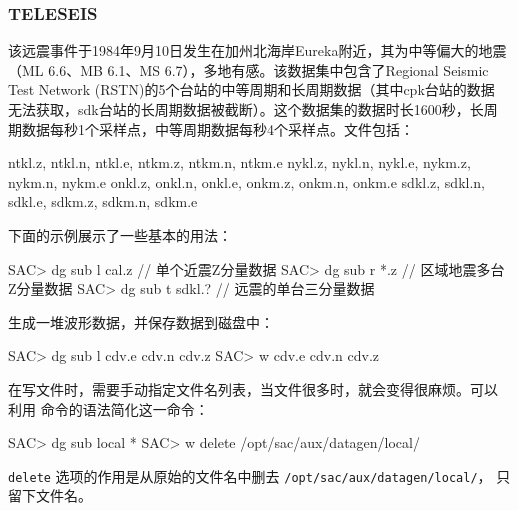 \subsubsection*{TELESEIS}
该远震事件于1984年9月10日发生在加州北海岸Eureka附近，其为中等偏大的地震
（ML 6.6、MB 6.1、MS 6.7），多地有感。该数据集中包含了Regional Seismic
Test Network (RSTN)的5个台站的中等周期和长周期数据（其中cpk台站的数据
无法获取，sdk台站的长周期数据被截断）。这个数据集的数据时长1600秒，长周
期数据每秒1个采样点，中等周期数据每秒4个采样点。文件包括：
\begin{SACCode}
    ntkl.z, ntkl.n, ntkl.e, ntkm.z, ntkm.n, ntkm.e
    nykl.z, nykl.n, nykl.e, nykm.z, nykm.n, nykm.e
    onkl.z, onkl.n, onkl.e, onkm.z, onkm.n, onkm.e
    sdkl.z, sdkl.n, sdkl.e, sdkm.z, sdkm.n, sdkm.e
\end{SACCode}

下面的示例展示了一些基本的用法：
\begin{SACCode}
SAC> dg sub l cal.z    // 单个近震Z分量数据
SAC> dg sub r *.z      // 区域地震多台Z分量数据
SAC> dg sub t sdkl.?   // 远震的单台三分量数据
\end{SACCode}

生成一堆波形数据，并保存数据到磁盘中：
\begin{SACCode}
SAC> dg sub l cdv.e cdv.n cdv.z
SAC> w cdv.e cdv.n cdv.z
\end{SACCode}
在写文件时，需要手动指定文件名列表，当文件很多时，就会变得很麻烦。可以
利用  命令的语法简化这一命令：
\begin{SACCode}
SAC> dg sub local *
SAC> w delete /opt/sac/aux/datagen/local/
\end{SACCode}
\texttt{delete} 选项的作用是从原始的文件名中删去 \texttt{/opt/sac/aux/datagen/local/}，
只留下文件名。
